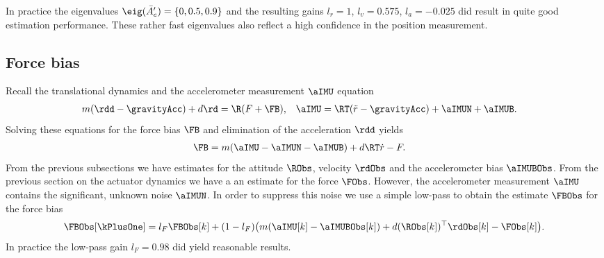 In practice the eigenvalues $\eig(\bar{A}'_e) = \{ 0, 0.5, 0.9 \}$ and the resulting gains $l_r = 1$, $l_v = 0.575$, $l_a = -0.025$ did result in quite good estimation performance.
These rather fast eigenvalues also reflect a high confidence in the position measurement.


\subsection{Force bias}
Recall the translational \Multicopter dynamics and the accelerometer measurement $\aIMU$ equation
\begin{align}
 m (\rdd - \gravityAcc) + d \rd &= \R (F + \FB),&
 \aIMU &= \RT (\ddot{r} - \gravityAcc) + \aIMUN + \aIMUB.
\end{align}
Solving these equations for the force bias $\FB$ and elimination of the acceleration $\rdd$ yields
\begin{align}
 \FB &= m (\aIMU - \aIMUN - \aIMUB) + d \RT \dot{r} - F.
\end{align}
From the previous subsections we have estimates for the attitude $\RObs$, velocity $\rdObs$ and the accelerometer bias $\aIMUBObs$.
From the previous section on the actuator dynamics we have a an estimate for the \Multicopter force $\FObs$.
However, the accelerometer measurement $\aIMU$ contains the significant, unknown noise $\aIMUN$.
In order to suppress this noise we use a simple low-pass to obtain the estimate $\FBObs$ for the force bias
\begin{align}
 \FBObs[\kPlusOne] = l_F \FBObs[k] + (1 - l_F) \big( m (\aIMU[k] - \aIMUBObs[k]) + d (\RObs[k])^\top \rdObs[k] - \FObs[k] \big)
 .
\end{align}
In practice the low-pass gain $l_F = 0.98$ did yield reasonable results.
